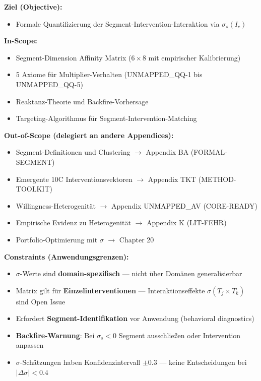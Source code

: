 \begin{tcolorbox}[
    colback=orange!5!white,
    colframe=orange!75!black,
    title={\textbf{Appendix Scope: Ziel / In-Scope / Out-of-Scope / Constraints}},
    fonttitle=\bfseries
]

\textbf{Ziel (Objective):}
\begin{itemize}[nosep]
    \item Formale Quantifizierung der Segment-Intervention-Interaktion via $\sigma_s(I_c)$
\end{itemize}

\textbf{In-Scope:}
\begin{itemize}[nosep]
    \item Segment-Dimension Affinity Matrix ($6 \times 8$ mit empirischer Kalibrierung)
    \item 5 Axiome für Multiplier-Verhalten (UNMAPPED_QQ-1 bis UNMAPPED_QQ-5)
    \item Reaktanz-Theorie und Backfire-Vorhersage
    \item Targeting-Algorithmus für Segment-Intervention-Matching
\end{itemize}

\textbf{Out-of-Scope (delegiert an andere Appendices):}
\begin{itemize}[nosep]
    \item Segment-Definitionen und Clustering $\rightarrow$ Appendix BA (FORMAL-SEGMENT)
    \item Emergente 10C Interventionsvektoren $\rightarrow$ Appendix TKT (METHOD-TOOLKIT)
    \item Willingness-Heterogenität $\rightarrow$ Appendix UNMAPPED_AV (CORE-READY)
    \item Empirische Evidenz zu Heterogenität $\rightarrow$ Appendix K (LIT-FEHR)
    \item Portfolio-Optimierung mit $\sigma$ $\rightarrow$ Chapter 20
\end{itemize}

\textbf{Constraints (Anwendungsgrenzen):}
\begin{itemize}[nosep]
    \item $\sigma$-Werte sind \textbf{domain-spezifisch} --- nicht über Domänen generalisierbar
    \item Matrix gilt für \textbf{Einzelinterventionen} --- Interaktionseffekte $\sigma(T_j \times T_k)$ sind Open Issue
    \item Erfordert \textbf{Segment-Identifikation} vor Anwendung (behavioral diagnostics)
    \item \textbf{Backfire-Warnung}: Bei $\sigma_s < 0$ Segment ausschließen oder Intervention anpassen
    \item $\sigma$-Schätzungen haben Konfidenzintervall $\pm 0.3$ --- keine Entscheidungen bei $|\Delta\sigma| < 0.4$
\end{itemize}


\end{tcolorbox}

